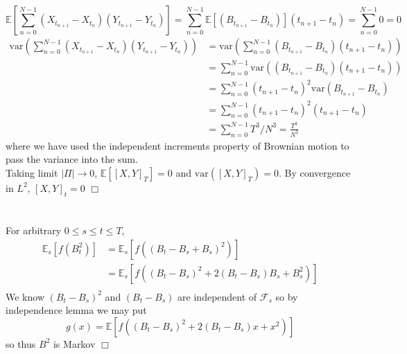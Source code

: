 \documentclass{article}
\begin{document}
\section{}
$$\mathbb{E} \left[ \sum_{n = 0}^{N - 1} (X_{t_{n+1}} - X_{t_n})(Y_{t_{n+1}} - Y_{t_n}) \right] = \sum_{n = 0}^{N - 1} \mathbb{E}[(B_{t_{n+1}} - B_{t_n})](t_{n+1} - t_n) = \sum_{n = 0}^{N - 1} 0 = 0 $$
\begin{equation*}
\begin{split}
\mathrm{var}\left( \sum_{n = 0}^{N - 1} (X_{t_{n+1}} - X_{t_n})(Y_{t_{n+1}} - Y_{t_n}) \right) &= \mathrm{var}\left( \sum_{n = 0}^{N - 1} (B_{t_{n+1}} - B_{t_n})(t_{n+1} - t_n) \right)\\
&= \sum_{n = 0}^{N - 1} \mathrm{var}\left( (B_{t_{n+1}} - B_{t_n})(t_{n+1} - t_n) \right)\\
&= \sum_{n = 0}^{N - 1} (t_{n+1} - t_n)^2 \mathrm{var}(B_{t_{n+1}} - B_{t_n})\\
&= \sum_{n = 0}^{N - 1} (t_{n+1} - t_n)^2 (t_{n+1} - t_n)\\
&= \sum_{n = 0}^{N - 1} T^3/N^3 = \frac{T^3}{N^2}
\end{split}
\end{equation*}
where we have used the independent increments property of Brownian motion to pass the variance into the sum.\\
Taking limit $|\Pi| \to 0$, $\mathbb{E}[[X,Y]_T] = 0$ and $\mathrm{var}([X,Y]_T) = 0$. By convergence in $L^2$, $[X,Y]_t = 0$ $\Box$

\section{}
For arbitrary $0 \leq s \leq t \leq T$,
\begin{equation*}
\begin{split}
\mathbb{E}_s[f(B_t^2)] &= \mathbb{E}_s[f((B_t - B_s + B_s)^2)]\\
&= \mathbb{E}_s[f((B_t - B_s)^2 + 2(B_t - B_s)B_s + B_s^2)]\\
\end{split}
\end{equation*}
We know $(B_t - B_s)^2$ and $(B_t - B_s)$ are independent of $\mathcal{F}_s$ so by independence lemma we may put
$$g(x) = \mathbb{E}[f((B_t - B_s)^2 + 2(B_t - B_s)x + x^2)]$$
so thus $B^2$ is Markov $\Box$
\end{document}
